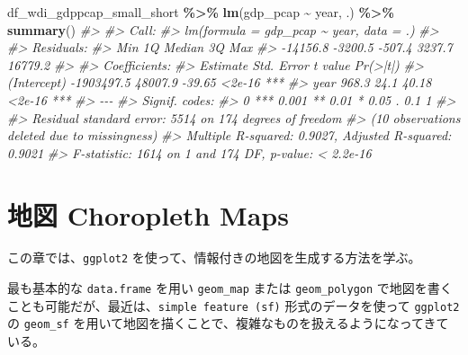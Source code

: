 \documentclass[
  xelatex, ja=standard]{bxjsbook}
\newenvironment{Shaded}{\begin{snugshade}}{\end{snugshade}}
\newcommand{\CommentTok}[1]{\textcolor[rgb]{0.56,0.35,0.01}{\textit{#1}}}
\newcommand{\FunctionTok}[1]{\textcolor[rgb]{0.13,0.29,0.53}{\textbf{#1}}}
\newcommand{\NormalTok}[1]{#1}
\newcommand{\SpecialCharTok}[1]{\textcolor[rgb]{0.81,0.36,0.00}{\textbf{#1}}}
\theoremstyle{definition}
\theoremstyle{definition}
\theoremstyle{definition}
\theoremstyle{definition}
\theoremstyle{remark}
\begin{document}
\begin{Shaded}
\begin{Highlighting}[]
\NormalTok{df\_wdi\_gdppcap\_small\_short }\SpecialCharTok{\%\textgreater{}\%} \FunctionTok{lm}\NormalTok{(gdp\_pcap }\SpecialCharTok{\textasciitilde{}}\NormalTok{ year, .) }\SpecialCharTok{\%\textgreater{}\%} \FunctionTok{summary}\NormalTok{()}
\CommentTok{\#\textgreater{} }
\CommentTok{\#\textgreater{} Call:}
\CommentTok{\#\textgreater{} lm(formula = gdp\_pcap \textasciitilde{} year, data = .)}
\CommentTok{\#\textgreater{} }
\CommentTok{\#\textgreater{} Residuals:}
\CommentTok{\#\textgreater{}      Min       1Q   Median       3Q      Max }
\CommentTok{\#\textgreater{} {-}14156.8  {-}3200.5   {-}507.4   3237.7  16779.2 }
\CommentTok{\#\textgreater{} }
\CommentTok{\#\textgreater{} Coefficients:}
\CommentTok{\#\textgreater{}               Estimate Std. Error t value Pr(\textgreater{}|t|)    }
\CommentTok{\#\textgreater{} (Intercept) {-}1903497.5    48007.9  {-}39.65   \textless{}2e{-}16 ***}
\CommentTok{\#\textgreater{} year             968.3       24.1   40.18   \textless{}2e{-}16 ***}
\CommentTok{\#\textgreater{} {-}{-}{-}}
\CommentTok{\#\textgreater{} Signif. codes:  }
\CommentTok{\#\textgreater{} 0 \textquotesingle{}***\textquotesingle{} 0.001 \textquotesingle{}**\textquotesingle{} 0.01 \textquotesingle{}*\textquotesingle{} 0.05 \textquotesingle{}.\textquotesingle{} 0.1 \textquotesingle{} \textquotesingle{} 1}
\CommentTok{\#\textgreater{} }
\CommentTok{\#\textgreater{} Residual standard error: 5514 on 174 degrees of freedom}
\CommentTok{\#\textgreater{}   (10 observations deleted due to missingness)}
\CommentTok{\#\textgreater{} Multiple R{-}squared:  0.9027, Adjusted R{-}squared:  0.9021 }
\CommentTok{\#\textgreater{} F{-}statistic:  1614 on 1 and 174 DF,  p{-}value: \textless{} 2.2e{-}16}
\end{Highlighting}
\end{Shaded}

\hypertarget{worldmap}{%
\chapter{地図 Choropleth Maps}\label{worldmap}}

この章では、\texttt{ggplot2} を使って、情報付きの地図を生成する方法を学ぶ。

最も基本的な \texttt{data.frame} を用い \texttt{geom\_map} または \texttt{geom\_polygon} で地図を書くことも可能だが、最近は、\texttt{simple\ feature\ (sf)} 形式のデータを使って \texttt{ggplot2} の \texttt{geom\_sf} を用いて地図を描くことで、複雑なものを扱えるようになってきている。
\end{document}
